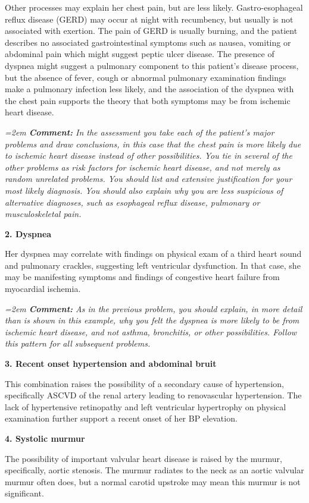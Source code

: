 \documentclass[11pt]{article}
\newcommand{\cm}[1]{%
  \par\nopagebreak\vspace{-0.2em}%
  \begingroup\small\itshape\color{cmtcolor}%
  \hangindent=2em \hangafter=0 \hspace*{1.2em}\textbf{Comment:} #1\par%
  \endgroup}
\newcommand{\lbl}[1]{\textbf{#1}\par\nopagebreak}
\begin{document}
Other processes may explain her chest pain, but are less likely. Gastro-esophageal reflux disease (GERD) may occur at night with recumbency, but usually is not associated with exertion. The pain of GERD is usually burning, and the patient describes no associated gastrointestinal symptoms such as nausea, vomiting or abdominal pain which might suggest peptic ulcer disease. The presence of dyspnea might suggest a pulmonary component to this patient's disease process, but the absence of fever, cough or abnormal pulmonary examination findings make a pulmonary infection less likely, and the association of the dyspnea with the chest pain supports the theory that both symptoms may be from ischemic heart disease.
\cm{In the assessment you take each of the patient's major problems and draw conclusions, in this case that the chest pain is more likely due to ischemic heart disease instead of other possibilities. You tie in several of the other problems as risk factors for ischemic heart disease, and not merely as random unrelated problems. You should list and extensive justification for your most likely diagnosis. You should also explain why you are less suspicious of alternative diagnoses, such as esophageal reflux disease, pulmonary or musculoskeletal pain.}

\lbl{2. Dyspnea}
Her dyspnea may correlate with findings on physical exam of a third heart sound and pulmonary crackles, suggesting left ventricular dysfunction. In that case, she may be manifesting symptoms and findings of congestive heart failure from myocardial ischemia.
\cm{As in the previous problem, you should explain, in more detail than is shown in this example, why you felt the dyspnea is more likely to be from ischemic heart disease, and not asthma, bronchitis, or other possibilities. Follow this pattern for all subsequent problems.}

\lbl{3. Recent onset hypertension and abdominal bruit}
This combination raises the possibility of a secondary cause of hypertension, specifically ASCVD of the renal artery leading to renovascular hypertension. The lack of hypertensive retinopathy and left ventricular hypertrophy on physical examination further support a recent onset of her BP elevation.

\lbl{4. Systolic murmur}
The possibility of important valvular heart disease is raised by the murmur, specifically, aortic stenosis. The murmur radiates to the neck as an aortic valvular murmur often does, but a normal carotid upstroke may mean this murmur is not significant.
\end{document}
